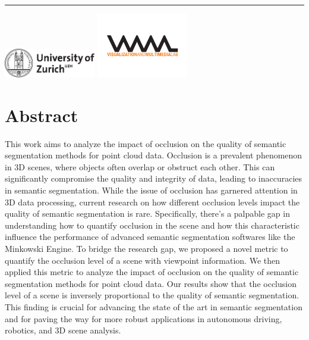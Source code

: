 \documentclass[11pt, a4paper,oneside,chapterprefix=false]{scrbook}
\begin{document}
\begin{titlepage}
	\vfill
	\hrule
	\vspace{0.5cm}
	\includegraphics*[width=0.3\textwidth]{figures/uzh_logo} \hfill
	\includegraphics*[width=0.3\textwidth]{figures/vmml_logo}
\end{titlepage}

\chapter{Abstract} \label{chp:abstract}

This work aims to analyze the impact of occlusion on the quality of semantic segmentation methods for point cloud data. Occlusion is a prevalent phenomenon in 3D scenes, where objects often overlap or obstruct each other. This can significantly compromise the quality and integrity of data, leading to inaccuracies in semantic segmentation. While the issue of occlusion has garnered attention in 3D data processing, current research on how different occlusion levels impact the quality of semantic segmentation is rare. Specifically, there's a palpable gap in understanding how to quantify occlusion in the scene and how this characteristic influence the performance of advanced semantic segmentation softwares like the Minkowski Engine. To bridge the research gap, we proposed a novel metric to quantify the occlusion level of a scene with viewpoint information. We then applied this metric to analyze the impact of occlusion on the quality of semantic segmentation methods for point cloud data. Our results show that the occlusion level of a scene is inversely proportional to the quality of semantic segmentation. This finding is crucial for advancing the state of the art in semantic segmentation and for paving the way for more robust applications in autonomous driving, robotics, and 3D scene analysis.

\tableofcontents

\mainmatter
\end{document}
